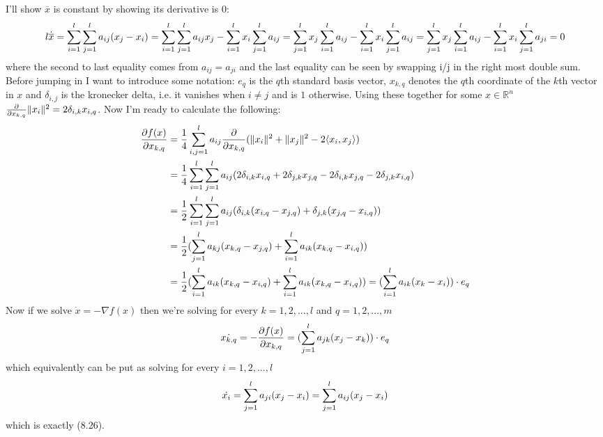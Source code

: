\documentclass{article}
\newenvironment{ex}[1]
  {\renewcommand\theexercise{#1}\exercise}
  {\endexercise}
\newcommand{\R}[1]{\mathbb{R}^{#1}}
\newcommand{\xb}{\overline{x}}
\begin{document}
\begin{ex}{8.19} %
  I'll show $\xb$ is constant by showing its derivative is $0$:
  $$
  l \dot{\xb} = \sum_{i=1}^l \sum_{j=1}^l a_{ij} \parens{x_j - x_i} = \sum_{i=1}^l \sum_{j=1}^l a_{ij} x_j - \sum_{i=1}^l x_i \sum_{j=1}^l a_{ij} = \sum_{j=1}^l x_j \sum_{i=1}^l a_{ij} - \sum_{i=1}^l x_i \sum_{j=1}^l a_{ij} = \sum_{j=1}^l x_j \sum_{i=1}^l a_{ij} - \sum_{i=1}^l x_i \sum_{j=1}^l a_{ji} = 0
  $$
  where the second to last equality comes from $a_{ij} = a_{ji}$ and the last equality can be seen by swapping i/j in the right most double sum.
\end{ex} %
\newpage
\begin{ex}{8.20} %
  Before jumping in I want to introduce some notation: $e_q$ is the $q$th standard basis vector, $x_{k,q}$ denotes the $q$th coordinate of the $k$th vector in $x$ and $\delta_{i,j}$ is the kronecker delta, i.e. it vanishes when $i \ne j$ and is $1$ otherwise. Using these together for some $x \in \R{n}$ $\frac{\partial}{\partial x_{k,q}} \lVert x_i\rVert^2 = 2 \delta_{i,k} x_{i,q}$. Now I'm ready to calculate the following:
  \begin{align*}
    \frac{\partial f(x)}{\partial x_{k,q}} &= \frac{1}{4} \sum_{i,j=1}^l a_{ij} \frac{\partial}{\partial x_{k, q}} ( \lVert x_i\rVert^2 + \lVert x_j\rVert^2 - 2\langle x_i, x_j\rangle ) \\
    &= \frac{1}{4} \sum_{i=1}^l \sum_{j=1}^l a_{ij} ( 2 \delta_{i,k} x_{i,q} + 2\delta_{j,k} x_{j,q} - 2 \delta_{i,k} x_{j,q} - 2\delta_{j,k} x_{i,q} ) \\
    &= \frac{1}{2} \sum_{i=1}^l \sum_{j=1}^l a_{ij} ( \delta_{i,k} ( x_{i,q} - x_{j,q} ) + \delta_{j, k} ( x_{j,q} - x_{i,q} ) ) \\
    &= \frac{1}{2} ( \sum_{j=1}^l a_{kj} ( x_{k,q} - x_{j,q} ) + \sum_{i=1}^l a_{ik} ( x_{k,q} - x_{i,q} ) ) \\
    &= \frac{1}{2} ( \sum_{i=1}^l a_{ik} ( x_{k,q} - x_{i,q} ) + \sum_{i=1}^l a_{ik} ( x_{k,q} - x_{i,q} ) ) = ( \sum_{i=1}^l a_{ik} ( x_k - x_i ) ) \cdot e_q
  \end{align*}
  Now if we solve $\dot{x} = -\nabla f(x)$ then we're solving for every $k = 1,2, ..., l$ and $q = 1, 2, ..., m$
  $$
  \dot{x_{k,q}} = -\frac{\partial f(x)}{\partial x_{k,q}} = ( \sum_{j=1}^l a_{jk} ( x_j - x_k ) ) \cdot e_q
  $$
  which equivalently can be put as solving for every $i = 1, 2, ..., l$
  $$
  \dot{x_i} = \sum_{j=1}^l a_{ji} ( x_j - x_i ) = \sum_{j=1}^l a_{ij} ( x_j - x_i )
  $$
  which is exactly (8.26). \, \\


\end{ex}
\end{document}
